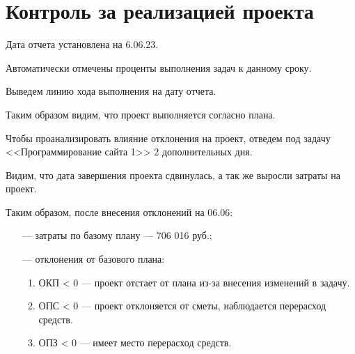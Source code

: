 \section{Контроль за реализацией проекта}

Дата отчета установлена на 6.06.23.

Автоматически отмечены проценты выполнения задач к данному сроку.


Выведем линию хода выполнения на дату отчета.


Таким образом видим, что проект выполняется согласно плана.

Чтобы проанализировать влияние отклонения на проект, отведем под задачу <<Программирование сайта 1>> 2 дополнительных дня.



Видим, что дата завершения проекта сдвинулась, а так же выросли затраты на проект.


Таким образом, после внесения отклонений на 06.06:\\
\begin{itemize}
    \item[---] затраты по базому плану --- 706 016 руб.;
    \item[---] отклонения от базового плана:
    \begin{enumerate}
        \item ОКП < 0 --- проект отстает от плана из-за внесения изменений в задачу.
        \item ОПС < 0 --- проект отклоняется от сметы, наблюдается перерасход средств.
        \item ОПЗ < 0 --- имеет место перерасход средств.
    \end{enumerate}
\end{itemize}



